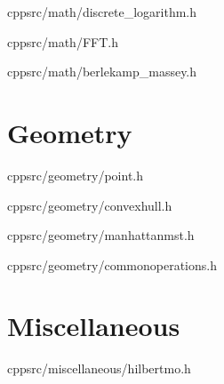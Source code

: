 \documentclass[portrait, 8pt, a4paper, oneside, twocolumn]{extarticle}
\begin{document}
    {}
    {}
    {cpp}{src/math/discrete_logarithm.h}
    \noindent\hrulefill

    {}
    {}
    {cpp}{src/math/FFT.h}
    \noindent\hrulefill
    
    {}
    {}
    {cpp}{src/math/berlekamp_massey.h}
    \noindent\hrulefill

\section{Geometry}

    {}
    {}
    {cpp}{src/geometry/point.h}
    \noindent\hrulefill

    {}
    {}
    {cpp}{src/geometry/convexhull.h}
    \noindent\hrulefill

    {}
    {}
    {cpp}{src/geometry/manhattanmst.h}
    \noindent\hrulefill

    {}
    {}
    {cpp}{src/geometry/commonoperations.h}
    \noindent\hrulefill

\section{Miscellaneous}

    {}
    {}
    {cpp}{src/miscellaneous/hilbertmo.h}
    \noindent\hrulefill
\end{document}
